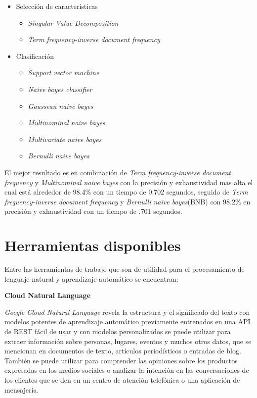 \begin{itemize}
	\item Selección de características
	\begin{itemize}
		\item \textit{Singular Value Decomposition}
		\item \textit{Term frequency-inverse document frequency}
	\end{itemize}

	\item Clasificación
	\begin{itemize}
		\item \textit{Support vector machine}
		\item \textit{Naive bayes classifier}
		\item \textit{Gaussean naive bayes}
		\item \textit{Multinominal naive bayes}
		\item \textit{Multivariate naive bayes}
		\item \textit{Bernulli naive bayes}
	\end{itemize}
\end{itemize}

 El mejor resultado es en combinación de \textit{Term frequency-inverse document frequency} y  \textit{Multinominal naive bayes} con la precisión y exhaustividad mas alta el cual está alrededor de 98.4\% con un tiempo de 0.702 segundos, seguido de \textit{Term frequency-inverse document frequency} y \textit{Bernulli naive bayes}(BNB)  con 98.2\% en precisión y exhaustividad con un tiempo de .701 segundos.



\section[Herramientas d.]{Herramientas disponibles}


Entre las herramientas de trabajo que son de utilidad para el procesamiento de lenguaje natural y aprendizaje automático se encuentran:\\

\begin{large}
	 \textbf{Cloud Natural Language}\\
\end{large} 

\textit{Google Cloud Natural Language} \citep{CD12}   revela la estructura y el significado del texto con modelos potentes de aprendizaje automático previamente entrenados en una API de REST fácil de usar y con modelos personalizados se puede utilizar para extraer información sobre personas, lugares, eventos y muchos otros datos, que se mencionan en documentos de texto, artículos periodísticos o entradas de blog. También se puede utilizar para comprender las opiniones sobre los productos expresadas en los medios sociales o analizar la intención en las conversaciones de los clientes que se den en un centro de atención telefónica o una aplicación de mensajería.\\

